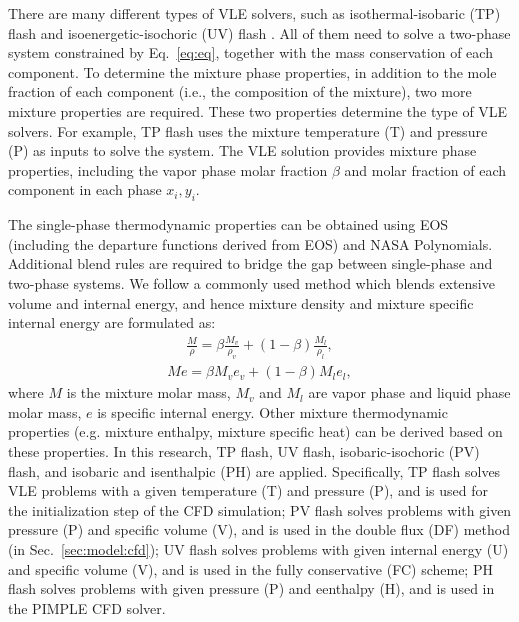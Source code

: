 There are many different types of VLE solvers, such as isothermal-isobaric (TP) flash \cite{michelsen1982isothermal} and isoenergetic-isochoric (UV) flash \cite{saha1997isoenergetic}. All of them need to solve a two-phase system constrained by Eq.~\ref{eq:eq}, together with the mass conservation of each component. To determine the mixture phase properties, in addition to the mole fraction of each component (i.e., the composition of the mixture), two more mixture properties are required. These two properties determine the type of VLE solvers. For example, TP flash uses the mixture temperature (T) and pressure (P) as inputs to solve the system. The VLE solution provides mixture phase properties, including the vapor phase molar fraction $\beta$ and molar fraction of each component in each phase $x_i,y_i$. 

The single-phase thermodynamic properties can be obtained using EOS (including the departure functions derived from EOS) and NASA Polynomials. Additional blend rules are required to bridge the gap between single-phase and two-phase systems. We follow a commonly used method which blends \cite{matheis2018multi,tudisco2020numerical} extensive volume and internal energy, and hence mixture density and mixture specific internal energy are formulated as:
\begin{align} \frac{M}{\rho} = \beta \frac{M_v}{\rho_v}+\left(1-\beta\right)\frac{M_l}{\rho_l}, \label{eq:rho}
\end{align}
\begin{align} Me = \beta M_v e_v + \left(1-\beta\right)M_l e_l, \label{eq:e}
\end{align}
where $M$ is the mixture molar mass, $M_v$ and $M_l$ are vapor phase and liquid phase molar mass, $e$ is specific internal energy. 
Other mixture thermodynamic properties (e.g. mixture enthalpy, mixture specific heat) can be derived based on these properties. 
In this research, TP flash, UV flash, isobaric-isochoric (PV) flash, and isobaric and isenthalpic (PH) are applied. Specifically, 
TP flash solves VLE problems with a given temperature (T) and pressure (P), and is used for the initialization step of the CFD simulation; PV flash solves problems with given pressure (P) and specific volume (V), and is used in the double flux (DF) method (in Sec.~\ref{sec:model:cfd}); UV flash solves problems with given internal energy (U) and specific volume (V), and is used in the fully conservative (FC) scheme; PH flash solves problems with given pressure (P) and eenthalpy (H), and is used in the PIMPLE CFD solver.

